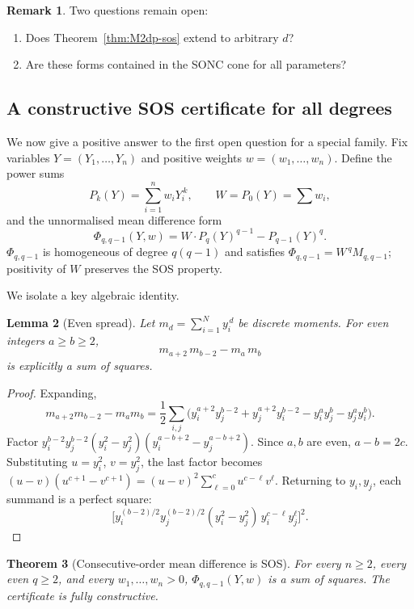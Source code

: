 \documentclass{amsart}
\newtheorem{thm}{Theorem}[section]
\newtheorem{lemma}[thm]{Lemma}
\theoremstyle{definition}
\newtheorem{rem}[thm]{Remark}
\numberwithin{equation}{section}
\begin{document}
\begin{rem}\label{rem:open}
Two questions remain open:
\begin{enumerate}
  \item Does Theorem~\ref{thm:M2dp-sos} extend to arbitrary $d$?
  \item Are these forms contained in the SONC cone for all parameters?
\end{enumerate}
\end{rem}

\subsection{A constructive SOS certificate for all degrees}

We now give a positive answer to the first open question for a special
family.  Fix variables $Y=(Y_1,\dots,Y_n)$ and positive weights
$w=(w_1,\dots,w_n)$.  Define the power sums
\[
P_k(Y)=\sum_{i=1}^n w_iY_i^{\,k},\qquad W=P_0(Y)=\sum w_i,
\]
and the unnormalised mean difference form
\[
\Phi_{q,q-1}(Y,w)=W\cdot P_q(Y)^{q-1}-P_{q-1}(Y)^q.
\]
$\Phi_{q,q-1}$ is homogeneous of degree $q(q-1)$ and satisfies
$\Phi_{q,q-1}=W^{\,q}M_{q,q-1}$; positivity of $W$ preserves the SOS
property.

We isolate a key algebraic identity.

\begin{lemma}[Even spread]\label{lem:even-spread}
Let $m_d=\sum_{i=1}^N y_i^{\,d}$ be discrete moments.  For even integers
$a\ge b\ge2$,
\[
m_{a+2}\,m_{b-2}-m_a\,m_b
\]
is explicitly a sum of squares.
\end{lemma}

\begin{proof}
Expanding,
\[
m_{a+2}m_{b-2}-m_am_b
=\frac12\sum_{i,j}
\bigl(y_i^{a+2}y_j^{b-2}+y_j^{a+2}y_i^{b-2}-y_i^ay_j^b-y_j^ay_i^b\bigr).
\]
Factor $y_i^{b-2}y_j^{b-2}(y_i^2-y_j^2)(y_i^{a-b+2}-y_j^{a-b+2})$.
Since $a,b$ are even, $a-b=2c$.  Substituting $u=y_i^2$, $v=y_j^2$,
the last factor becomes $(u-v)(u^{c+1}-v^{c+1})=(u-v)^2\sum_{\ell=0}^c
u^{c-\ell}v^\ell$.  Returning to $y_i,y_j$, each summand is a perfect
square:
\[
\bigl[y_i^{(b-2)/2}y_j^{(b-2)/2}(y_i^2-y_j^2)\,y_i^{c-\ell}y_j^\ell\bigr]^2.
\]
\end{proof}

\begin{thm}[Consecutive-order mean difference is SOS]\label{thm:consecutive-sos}
For every $n\ge2$, every even $q\ge2$, and every $w_1,\dots,w_n>0$,
$\Phi_{q,q-1}(Y,w)$ is a sum of squares.  The certificate is fully
constructive.
\end{thm}
\end{document}
